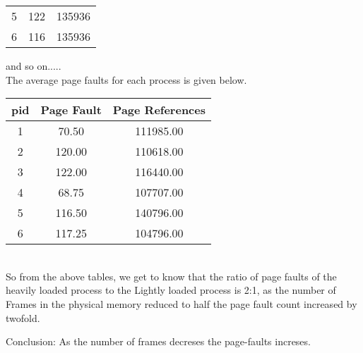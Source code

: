 \documentclass[a4paper,12pt]{article}
\begin{document}
\begin{enumerate}
\begin{table}[h!]
\begin{center}
\begin{tabular}{c|c|c}
             5   & 122  & 135936 \\
             6   & 116  & 135936 \\
             \end{tabular}
           \end{center}
         \end{table}
         and so on.....\\
         The average page faults for each process is given below.
         \begin{table}[h!]
           \begin{center}
             \begin{tabular}{c|c|c}
             \textbf{pid} & \textbf{Page Fault} & \textbf{Page References} \\
             \hline
             1   & 70.50   & 111985.00 \\
             2   & 120.00  & 110618.00  \\
             3   & 122.00  & 116440.00  \\
             4   & 68.75   & 107707.00  \\
             5   & 116.50  & 140796.00  \\
             6   & 117.25  & 104796.00  \\
             \end{tabular}
           \end{center}
         \end{table}\\
         So from the above tables, we get to know that the ratio of page faults of the heavily loaded process to the Lightly 
         loaded process is 2:1, as the number of Frames in the physical memory reduced to half the page fault count increased
         by twofold.
         
         Conclusion: As the number of frames decreses the page-faults increses.
  \end{enumerate}
\end{document}
